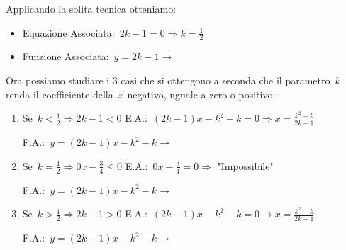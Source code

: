 Applicando la solita tecnica otteniamo:

\begin{itemize}
 \item
  Equazione Associata:~$2 k -1=0 \Rightarrow k=\frac{1}{2}$
 \item 
  \begin{minipage}{.40\textwidth}
  Funzione Associata:~$y=2 k -1 \rightarrow$
  \end{minipage}
  \begin{minipage}{.30\textwidth}
  
  \end{minipage}
\end{itemize}

Ora possiamo studiare i 3 casi che si ottengono a seconda che il 
parametro~$k$ renda il coefficiente della~$x$ negativo, uguale a zero 
o positivo:

\begin{enumerate}
 \item Se~$k < \frac{1}{2} \Rightarrow 2 k - 1 < 0$
 \subitem E.A.:~$(2 k - 1) x - k^2 - k = 0 \Rightarrow x=\frac{k^2 - k}{2 k - 1}$
 \subitem
  \begin{minipage}{.4\textwidth}
   F.A.:~$y=(2 k - 1) x - k^2 - k \rightarrow$
  \end{minipage}
  \begin{minipage}{.30\textwidth}
  
  \end{minipage}
 \item Se~$k = \frac{1}{2} \Rightarrow 0 x - \frac{3}{4} \le 0$
  \subitem E.A.:~$0 x - \frac{3}{4} = 0 \Rightarrow$ "Impossibile"
  \subitem
  \begin{minipage}{.4\textwidth}
   F.A.:~$y=(2 k - 1) x - k^2 - k \rightarrow$
  \end{minipage}
  \begin{minipage}{.30\textwidth}
  
  \end{minipage}
 \item Se~$k > \frac{1}{2} \Rightarrow 2 k - 1 > 0$
  \subitem E.A.:~$(2 k - 1 ) x - k^2 - k = 0 \rightarrow x=\frac{k^2 - k}{2 k - 1}$
  \subitem
  \begin{minipage}{.4\textwidth}
   F.A.:~$y=(2 k - 1 ) x - k^2 - k \rightarrow$
  \end{minipage}
  \begin{minipage}{.30\textwidth}
  
  \end{minipage}
\end{enumerate}


